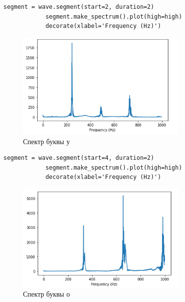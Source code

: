 \documentclass[a4paper,12pt]{article}
\begin{document}
\begin{enumerate}
		\begin{lstlisting}[caption=Спектр буквы у]
			segment = wave.segment(start=2, duration=2)
			segment.make_spectrum().plot(high=high)
			decorate(xlabel='Frequency (Hz)')
		\end{lstlisting}
		\begin{figure}[H]
			\centering
			\includegraphics[width=0.75\textwidth]{6_3.png}
			\caption{Спектр буквы у}
			\label{fig:6.3}
		\end{figure}
		
		\begin{lstlisting}[caption=Спектр буквы о]
			segment = wave.segment(start=4, duration=2)
			segment.make_spectrum().plot(high=high)
			decorate(xlabel='Frequency (Hz)')
		\end{lstlisting}
		\begin{figure}[H]
			\centering
			\includegraphics[width=0.75\textwidth]{6_4.png}
			\caption{Спектр буквы о}
			\label{fig:6.4}
		\end{figure}
		

\end{enumerate}
\end{document}

